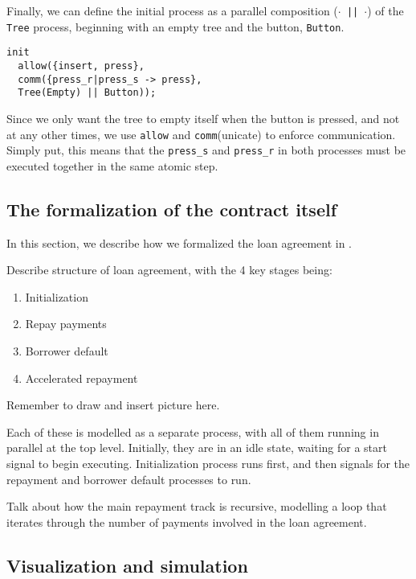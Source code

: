 \documentclass{article}
\begin{document}
Finally, we can define the initial process as a parallel composition
(\texttt{$\cdot$ || $\cdot$}) of the \texttt{Tree} process, beginning with an
empty tree and the button, \texttt{Button}.

\begin{verbatim}
init
  allow({insert, press},
  comm({press_r|press_s -> press},
  Tree(Empty) || Button));
\end{verbatim}

Since we only want the tree to empty itself when the button is pressed, and
not at any other times, we use \texttt{allow} and \texttt{comm}(unicate) to
enforce communication.
Simply put, this means that the \texttt{press\_s} and \texttt{press\_r} in both
processes must be executed together in the same atomic step.


\subsection{The formalization of the contract itself}
In this section, we describe how we formalized the loan agreement in \mcrl.
\inlinetodo

Describe structure of loan agreement, with the 4 key stages being:
\begin{enumerate}
  \item Initialization
  \item Repay payments
  \item Borrower default
  \item Accelerated repayment
\end{enumerate}

Remember to draw and insert picture here.

Each of these is modelled as a separate process, with all of them running
in parallel at the top level.
Initially, they are in an idle state, waiting for a start signal to begin
executing.
Initialization process runs first, and then signals for the repayment and
borrower default processes to run.

Talk about how the main repayment track is recursive, modelling a loop that
iterates through the number of payments involved in the loan agreement.

\subsection{Visualization and simulation}
\end{document}
